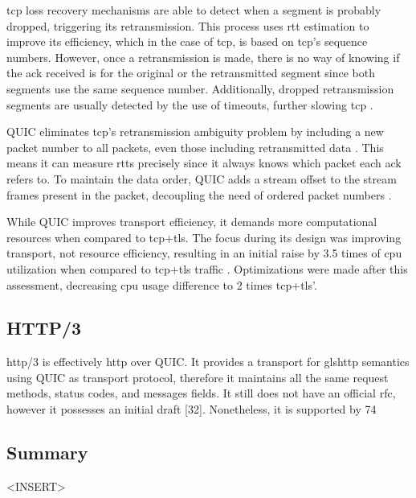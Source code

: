 \gls{tcp} loss recovery mechanisms are able to detect when a segment is probably dropped, triggering its retransmission. This process uses \gls{rtt} estimation to improve its efficiency, which in the case of \gls{tcp}, is based on \gls{tcp}’s sequence numbers. However, once a retransmission is made, there is no way of knowing if the \gls{ack} received is for the original or the retransmitted segment since both segments use the same sequence number. Additionally, dropped retransmission segments are usually detected by the use of timeouts, further slowing \gls{tcp} \cite{quic_protocol,rfc2988,rfc9000,tcp_timer_dont_work_well}.

QUIC eliminates \gls{tcp}’s retransmission ambiguity problem by including a new packet number to all packets, even those including retransmitted data \cite{rfc9000}. This means it can measure \gls{rtt}s precisely since it always knows which packet each \gls{ack} refers to. To maintain the data order, QUIC adds a stream offset to the stream frames present in the packet, decoupling the need of ordered packet numbers \cite{quic_protocol}.

While QUIC improves transport efficiency, it demands more computational resources when compared to \gls{tcp}+\gls{tls}. The focus during its design was improving transport, not resource efficiency, resulting in an initial raise by 3.5 times of \gls{cpu} utilization when compared to \gls{tcp}+\gls{tls} traffic \cite{quic_protocol}. Optimizations were made after this assessment, decreasing \gls{cpu} usage difference to 2 times \gls{tcp}+\gls{tls}’.

\subsection{HTTP/3}

\gls{http}/3 is effectively \gls{http} over QUIC. It provides a transport for gls{http} semantics using QUIC as transport protocol, therefore it maintains all the same request methods, status codes, and messages fields. It still does not have an official \gls{rfc}, however it possesses an initial draft [32]. Nonetheless, it is supported by 74%

\subsection{Summary}
<INSERT>
